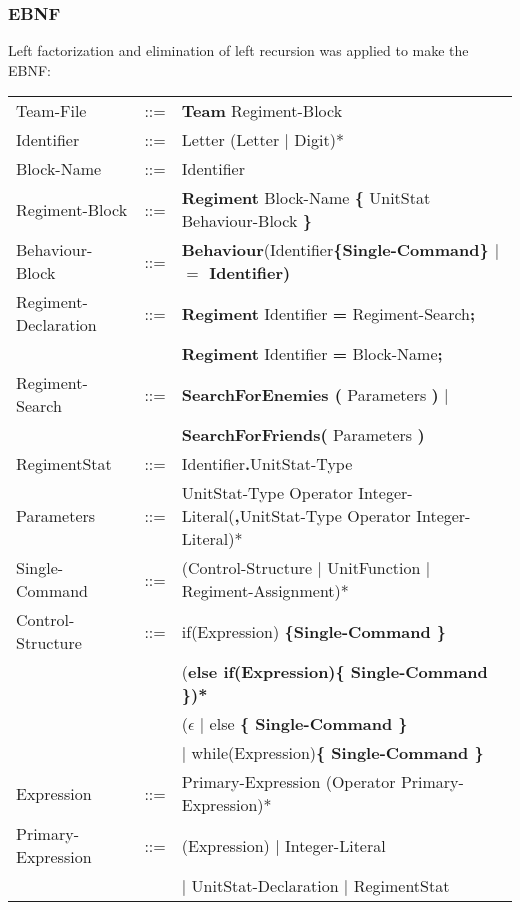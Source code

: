 	\subsubsection{EBNF}
		Left factorization and elimination of left recursion was applied to make the EBNF: \\
		\begin{center}
			\begin{longtable}{ l l l }
				\endfirsthead
				\endhead
				Team-File			&	::=	&{\bf Team} Regiment-Block \\
				Identifier			&	::=	&Letter (Letter $\mid$ Digit)*\\
				Block-Name			&	::=	&Identifier							\\
				Regiment-Block		&	::=	&{\bf Regiment} Block-Name {\bf \{ } UnitStat Behaviour-Block \bf{\} }\\
				Behaviour-Block		&	::=	&{\bf Behaviour}(Identifier\bf{\{}Single-Command\bf{\}} $\mid$ {\bf $=$} Identifier)\\
				Regiment-Declaration&	::=	&{\bf Regiment} Identifier {\bf =} Regiment-Search{\bf ;}\\
									&		&{\bf Regiment} Identifier {\bf =} Block-Name{\bf ;}\\
				Regiment-Search		&	::=	&{\bf SearchForEnemies (} Parameters {\bf )} $\mid$\\
									&		&{\bf SearchForFriends(} Parameters {\bf )}	 \\
				RegimentStat		&	::=	&Identifier{\bf.}UnitStat-Type \\
				Parameters			&	::=	&UnitStat-Type Operator Integer-Literal({\bf ,}UnitStat-Type Operator Integer-Literal)*\\
				Single-Command		&	::=	&(Control-Structure $\mid$ UnitFunction $\mid$ Regiment-Assignment)*\\		
				Control-Structure	&	::=	&if(Expression) \bf{\{}Single-Command \bf{\}}\\
									&		&(\bf{else if(}Expression\bf{)\{ }Single-Command\bf{ \}})* \\
									&		&($\epsilon$ $\mid$ else \bf{\{ }Single-Command \bf{\} }\\					   
									&		&$\mid$ while(Expression)\bf{\{ } Single-Command \bf{\}}\\
				Expression			&	::=	&Primary-Expression (Operator Primary-Expression)*\\
				Primary-Expression	&	::=	&(Expression) $\mid$ Integer-Literal \\
									&		&$\mid$ UnitStat-Declaration $\mid$ RegimentStat \\	

\end{longtable}
\end{center}
